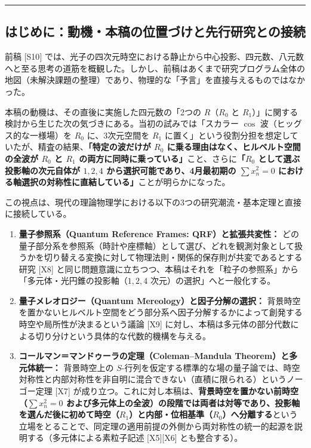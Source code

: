 \documentclass[
  a4paper,
]{ltjsarticle}
\providecommand{\tightlist}{%
  \setlength{\itemsep}{0pt}\setlength{\parskip}{0pt}}
\begin{document}
\begin{center}\rule{0.5\linewidth}{0.5pt}\end{center}

\subsection{はじめに：動機・本稿の位置づけと先行研究との接続}\label{ux306fux3058ux3081ux306bux52d5ux6a5fux672cux7a3fux306eux4f4dux7f6eux3065ux3051ux3068ux5148ux884cux7814ux7a76ux3068ux306eux63a5ux7d9a}

前稿 {[}S10{]}
では、光子の四次元時空における静止から中心投影、四元数、八元数へと至る思考の道筋を概観した。しかし、前稿はあくまで研究プログラム全体の地図（未解決課題の整理）であり、物理的な「予言」を直接与えるものではなかった。

本稿の動機は、その直後に実施した四元数の「2つの \(R\)（\(R_0\) と
\(R_1\)）」に関する検討から生じた次の気づきにある。当初の試みでは「スカラー
\(\cos\) 波（ヒッグス的な一様場）を \(R_0\) に、3次元空間を \(R_1\)
に置く」という役割分担を想定していたが、精査の結果、\textbf{「特定の波だけが
\(R_0\) に乗る理由はなく、ヒルベルト空間の全波が \(R_0\) と \(R_1\)
の両方に同時に乗っている」}こと、さらに\textbf{「\(R_0\)
として選ぶ投影軸の次元自体が \(1, 2, 4\) から選択可能であり、4月最初期の
\(\sum x_n^2 = 0\)
における軸選択の対称性に直結している」}ことが明らかになった。

この視点は、現代の理論物理学における以下の3つの研究潮流・基本定理と直接に接続している。

\begin{enumerate}
\def\labelenumi{\arabic{enumi}.}
\tightlist
\item
  \textbf{量子参照系（Quantum Reference Frames: QRF）と拡張共変性：}
  どの量子部分系を参照系（時計や座標軸）として選び、どれを観測対象として扱うかを切り替える変換に対して物理法則・関係的保存則が共変であるとする研究
  {[}X8{]}
  と同じ問題意識に立ちつつ、本稿はそれを「粒子の参照系」から「多元体・光円錐の投影軸（\(1, 2, 4\)
  次元）の選択」へと一般化する。
\item
  \textbf{量子メレオロジー（Quantum Mereology）と因子分解の選択：}
  背景時空を置かないヒルベルト空間をどう部分系へ因子分解するかによって創発する時空や局所性が決まるという議論
  {[}X9{]}
  に対し、本稿は多元体の部分代数による切り分けという具体的な代数的機構を与える。
\item
  \textbf{コールマン＝マンドゥーラの定理（Coleman--Mandula
  Theorem）と多元体統一：} 背景時空上の
  \(S\)-行列を仮定する標準的な場の量子論では、時空対称性と内部対称性を非自明に混合できない（直積に限られる）というノーゴー定理
  {[}X7{]}
  が成り立つ。これに対し本稿は、\textbf{背景時空を置かない前時空（\(\sum x_n^2 = 0\)
  および多元体上の全波）の段階では両者は対等であり、投影軸を選んだ後に初めて時空（\(R_1\)）と内部・位相基準（\(R_0\)）へ分離する}という立場をとることで、同定理の適用前提の外側から両対称性の統一的起源を説明する（多元体による素粒子記述
  {[}X5{]}{[}X6{]} とも整合する）。
\end{enumerate}
\end{document}
